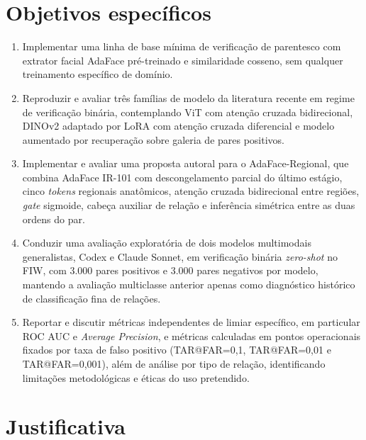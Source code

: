 \section{Objetivos específicos}

\begin{enumerate}
  \item Implementar uma linha de base mínima de verificação de parentesco com extrator facial AdaFace pré-treinado e similaridade cosseno, sem qualquer treinamento específico de domínio.
  \item Reproduzir e avaliar três famílias de modelo da literatura recente em regime de verificação binária, contemplando ViT com atenção cruzada bidirecional, DINOv2 adaptado por LoRA com atenção cruzada diferencial e modelo aumentado por recuperação sobre galeria de pares positivos.
  \item Implementar e avaliar uma proposta autoral para o AdaFace-Regional, que combina AdaFace IR-101 com descongelamento parcial do último estágio, cinco \textit{tokens} regionais anatômicos, atenção cruzada bidirecional entre regiões, \textit{gate} sigmoide, cabeça auxiliar de relação e inferência simétrica entre as duas ordens do par.
  \item Conduzir uma avaliação exploratória de dois modelos multimodais generalistas, Codex e Claude Sonnet, em verificação binária \textit{zero-shot} no FIW, com 3.000 pares positivos e 3.000 pares negativos por modelo, mantendo a avaliação multiclasse anterior apenas como diagnóstico histórico de classificação fina de relações.
  \item Reportar e discutir métricas independentes de limiar específico, em particular ROC AUC e \textit{Average Precision}, e métricas calculadas em pontos operacionais fixados por taxa de falso positivo (TAR@FAR=0,1, TAR@FAR=0,01 e TAR@FAR=0,001), além de análise por tipo de relação, identificando limitações metodológicas e éticas do uso pretendido.
\end{enumerate}

\section{Justificativa}

